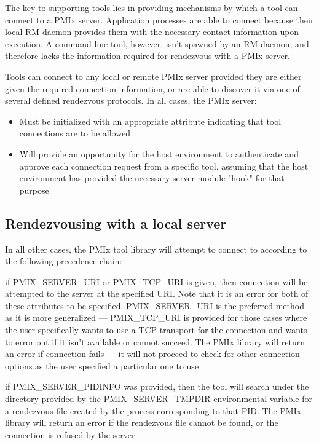 The key to supporting tools lies in providing mechanisms by which a tool can connect to a \ac{PMIx} server. Application processes are able to connect because their local \ac{RM} daemon provides them with the necessary contact information upon execution. A command-line tool, however, isn't spawned by an \ac{RM} daemon, and therefore lacks the information required for rendezvous with a \ac{PMIx} server.

Tools can connect to any local or remote \ac{PMIx} server provided they are either given the required connection information, or are able to discover it via one of several defined rendezvous protocols. In all cases, the \ac{PMIx} server:

\begin{itemize}
    \item Must be initialized with an appropriate attribute indicating that tool connections are to be allowed
    \item Will provide an opportunity for the host environment to authenticate and approve each connection request from a specific tool, assuming that the host environment has provided the necessary server module "hook" for that purpose
\end{itemize}


\subsection{Rendezvousing with a local server}

In all other cases, the PMIx tool library will attempt to connect to according to the following precedence chain:

if PMIX_SERVER_URI or PMIX_TCP_URI is given, then connection will be attempted to the server at the specified URI. Note that it is an error for both of these attributes to be specified. PMIX_SERVER_URI is the preferred method as it is more generalized — PMIX_TCP_URI is provided for those cases where the user specifically wants to use a TCP transport for the connection and wants to error out if it isn’t available or cannot succeed. The PMIx library will return an error if connection fails — it will not proceed to check for other connection options as the user specified a particular one to use

if PMIX_SERVER_PIDINFO was provided, then the tool will search under the directory provided by the PMIX_SERVER_TMPDIR environmental variable for a rendezvous file created by the process corresponding to that PID. The PMIx library will return an error if the rendezvous file cannot be found, or the connection is refused by the server

